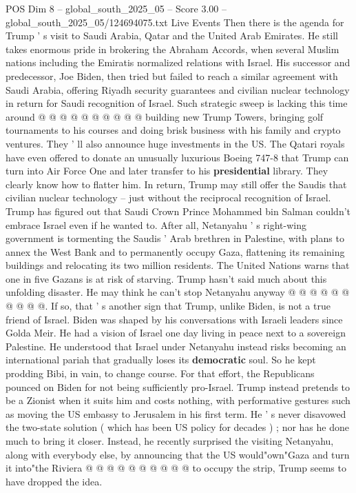 \begin{textsample}{POS Dim 8 – global\_south\_2025\_05 – Score 3.00 – global\_south\_2025\_05/124694075.txt}
Live Events Then there is the agenda for Trump ' s visit to Saudi Arabia, Qatar and the United Arab Emirates.
He still takes enormous pride in brokering the Abraham Accords, when several Muslim nations including the Emiratis normalized relations with Israel.
His successor and predecessor, Joe Biden, then tried but failed to reach a similar agreement with Saudi Arabia, offering Riyadh security guarantees and civilian nuclear technology in return for Saudi recognition of Israel.
Such strategic sweep is lacking this time around @ @ @ @ @ @ @ @ @ @ building new Trump Towers, bringing golf tournaments to his courses and doing brisk business with his family and crypto ventures.
They ' ll also announce huge investments in the US.
The Qatari royals have even offered to donate an unusually luxurious Boeing 747-8 that Trump can turn into Air Force One and later transfer to his \textbf{presidential} library.
They clearly know how to flatter him.
In return, Trump may still offer the Saudis that civilian nuclear technology -- just without the reciprocal recognition of Israel.
Trump has figured out that Saudi Crown Prince Mohammed bin Salman couldn't embrace Israel even if he wanted to.
After all, Netanyahu ' s right-wing government is tormenting the Saudis ' Arab brethren in Palestine, with plans to annex the West Bank and to permanently occupy Gaza, flattening its remaining buildings and relocating its two million residents.
The United Nations warns that one in five Gazans is at risk of starving.
Trump hasn't said much about this unfolding disaster.
He may think he can't stop Netanyahu anyway @ @ @ @ @ @ @ @ @ @.
If so, that ' s another sign that Trump, unlike Biden, is not a true friend of Israel.
Biden was shaped by his conversations with Israeli leaders since Golda Meir.
He had a vision of Israel one day living in peace next to a sovereign Palestine.
He understood that Israel under Netanyahu instead risks becoming an international pariah that gradually loses its \textbf{democratic} soul.
So he kept prodding Bibi, in vain, to change course.
For that effort, the Republicans pounced on Biden for not being sufficiently pro-Israel.
Trump instead pretends to be a Zionist when it suits him and costs nothing, with performative gestures such as moving the US embassy to Jerusalem in his first term.
He ' s never disavowed the two-state solution ( which has been US policy for decades ) ; nor has he done much to bring it closer.
Instead, he recently surprised the visiting Netanyahu, along with everybody else, by announcing that the US would"own"Gaza and turn it into"the Riviera @ @ @ @ @ @ @ @ @ @ to occupy the strip, Trump seems to have dropped the idea.

\end{textsample}
